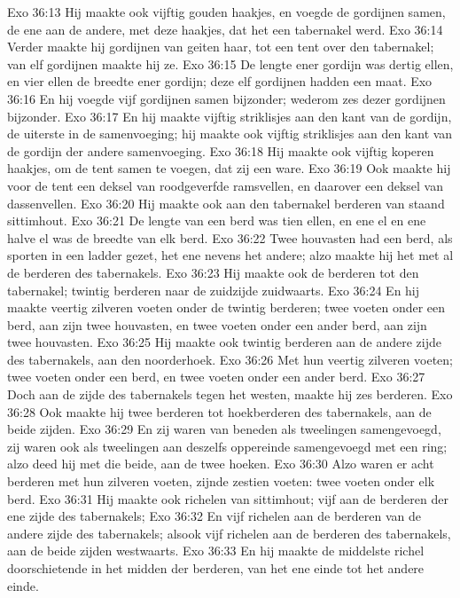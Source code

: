 Exo 36:13  Hij maakte ook vijftig gouden haakjes, en voegde de gordijnen samen, de ene aan de andere, met deze haakjes, dat het een tabernakel werd.
Exo 36:14  Verder maakte hij gordijnen van geiten haar, tot een tent over den tabernakel; van elf gordijnen maakte hij ze.
Exo 36:15  De lengte ener gordijn was dertig ellen, en vier ellen de breedte ener gordijn; deze elf gordijnen hadden een maat.
Exo 36:16  En hij voegde vijf gordijnen samen bijzonder; wederom zes dezer gordijnen bijzonder.
Exo 36:17  En hij maakte vijftig striklisjes aan den kant van de gordijn, de uiterste in de samenvoeging; hij maakte ook vijftig striklisjes aan den kant van de gordijn der andere samenvoeging.
Exo 36:18  Hij maakte ook vijftig koperen haakjes, om de tent samen te voegen, dat zij een ware.
Exo 36:19  Ook maakte hij voor de tent een deksel van roodgeverfde ramsvellen, en daarover een deksel van dassenvellen.
Exo 36:20  Hij maakte ook aan den tabernakel berderen van staand sittimhout.
Exo 36:21  De lengte van een berd was tien ellen, en ene el en ene halve el was de breedte van elk berd.
Exo 36:22  Twee houvasten had een berd, als sporten in een ladder gezet, het ene nevens het andere; alzo maakte hij het met al de berderen des tabernakels.
Exo 36:23  Hij maakte ook de berderen tot den tabernakel; twintig berderen naar de zuidzijde zuidwaarts.
Exo 36:24  En hij maakte veertig zilveren voeten onder de twintig berderen; twee voeten onder een berd, aan zijn twee houvasten, en twee voeten onder een ander berd, aan zijn twee houvasten.
Exo 36:25  Hij maakte ook twintig berderen aan de andere zijde des tabernakels, aan den noorderhoek.
Exo 36:26  Met hun veertig zilveren voeten; twee voeten onder een berd, en twee voeten onder een ander berd.
Exo 36:27  Doch aan de zijde des tabernakels tegen het westen, maakte hij zes berderen.
Exo 36:28  Ook maakte hij twee berderen tot hoekberderen des tabernakels, aan de beide zijden.
Exo 36:29  En zij waren van beneden als tweelingen samengevoegd, zij waren ook als tweelingen aan deszelfs oppereinde samengevoegd met een ring; alzo deed hij met die beide, aan de twee hoeken.
Exo 36:30  Alzo waren er acht berderen met hun zilveren voeten, zijnde zestien voeten: twee voeten onder elk berd.
Exo 36:31  Hij maakte ook richelen van sittimhout; vijf aan de berderen der ene zijde des tabernakels;
Exo 36:32  En vijf richelen aan de berderen van de andere zijde des tabernakels; alsook vijf richelen aan de berderen des tabernakels, aan de beide zijden westwaarts.
Exo 36:33  En hij maakte de middelste richel doorschietende in het midden der berderen, van het ene einde tot het andere einde.
